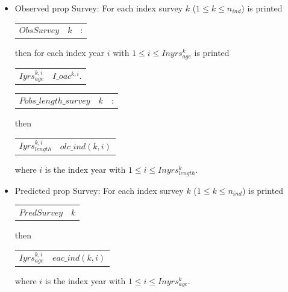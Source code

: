 \documentclass{article}
\begin{document}
\begin{itemize}
    \item Observed prop Survey: For each index survey $ k$ ($1\leq k \leq n_{ind}$) is printed
    \begin{center}
        \begin{tabular}{c c c}
           $ObsSurvey$  &  $k$ & :\\
        \end{tabular}
    \end{center}
    then for each index year $i$ with $1\leq i \leq Inyrs^k_{age}$ is printed
    \begin{center}
        \begin{tabular}{c c}
            $Iyrs^{k,i}_{age}$ & $I\_oac^{k,i}$. \\
        \end{tabular}
    \end{center}


     \begin{center}
        \begin{tabular}{c c c}
           $Pobs\_length\_survey$  &  $k$ & :\\
        \end{tabular}
    \end{center}

   then
    \begin{center}
        \begin{tabular}{c c}
           $Iyrs^{k,i}_{length}$  & $olc\_ind(k,i)$ \\
        \end{tabular}
    \end{center}
    where $i$ is the index year with $1\leq i \leq Inyrs^k_{length}$.

    \item Predicted prop Survey: For each index survey $k$ ($1\leq k \leq n_{ind}$) is printed
    \begin{center}
        \begin{tabular}{c c}
            $PredSurvey$  &  $k$ \\
            
        \end{tabular}
    \end{center}
    then 
    \begin{center}
        \begin{tabular}{c c}
           $Iyrs^{k,i}_{age}$  & $eac\_ind(k,i)$ \\
        \end{tabular}
    \end{center}
where $i$ is the index year with $1\leq i \leq Inyrs^k_{age}$.


\end{itemize}
\end{document}
